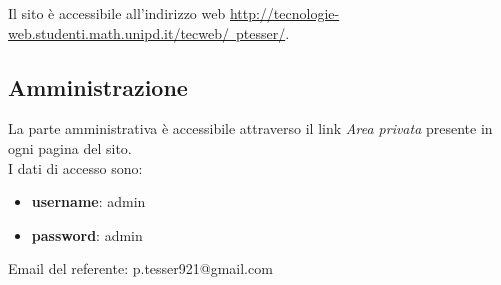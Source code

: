 Il sito \`e accessibile all'indirizzo web \href{http://tecnologie-web.studenti.math.unipd.it/tecweb/~ptesser/}{http://tecnologie-web.studenti.math.unipd.it/tecweb/~ptesser/}.

\subsection{Amministrazione}
La parte amministrativa \`e accessibile attraverso il link \textit{Area privata} presente in ogni pagina del sito. \\ I dati di accesso sono:
\begin{itemize}
	\item \textbf{username}: admin
	\item \textbf{password}: admin
\end{itemize}
Email del referente: p.tesser921@gmail.com